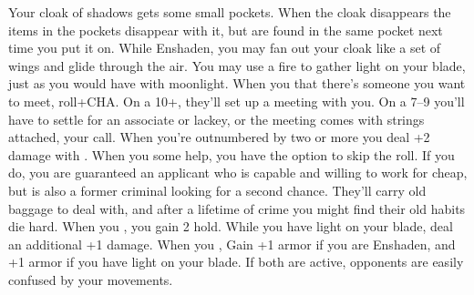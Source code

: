\documentclass[darkmode]{dw_playbook}
\begin{document}
    {
            {Your cloak of shadows gets some small pockets.  When the cloak disappears the items in the pockets disappear with it, but are found in the same pocket next time you put it on.}
        \gap
            {While Enshaden, you may fan out your cloak like a set of wings and glide through the air.}
        \gap
            {You may use a fire to gather light on your blade, just as you would have with moonlight.}
        \gap
            {When you  that there’s someone you want to meet, roll+CHA.  On a 10+, they’ll set up a meeting with you.  On a 7–9 you’ll have to settle for an associate or lackey, or the meeting comes with strings attached, your call.}
            {When you’re outnumbered by two or more you deal +2 damage with .}
        \gap
            {When you  some help, you have the option to skip the roll.  If you do, you are guaranteed an applicant who is capable and willing to work for cheap, but is also a former criminal looking for a second chance.  They’ll carry old baggage to deal with, and after a lifetime of crime you might find their old habits die hard.}
        \gap
            {When you , you gain 2 hold.  While you have light on your blade, deal an additional +1 damage.}
        \gap
            {When you , Gain +1 armor if you are Enshaden, and +1 armor if you have light on your blade.  If both are active, opponents are easily confused by your movements.}
    }
\end{document}
